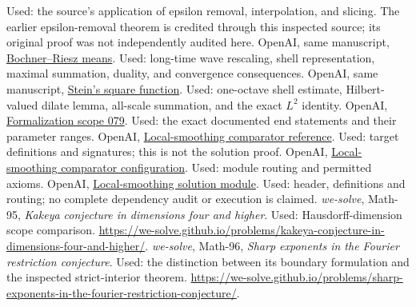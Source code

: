 \documentclass[11pt,a4paper]{article}
\numberwithin{equation}{section}
\theoremstyle{definition}
\theoremstyle{remark}
\newcommand{\repolink}[2]{\href{https://github.com/openai/math/blob/7ef5c0cc5ca4b0e072b7a050fca09ab24bc6fa3a/#1}{#2}}
\newcommand{\mathsource}[2]{\repolink{preprints/Local-smoothing-for-the-Euclidean-wave-equation-October-25-2026/build/sections/#1.tex}{#2}}
\begin{document}
\begin{thebibliography}{99}
Used: the source's application of epsilon removal, interpolation, and slicing.
The earlier epsilon-removal theorem is credited through this inspected source;
its original proof was not independently audited here.
 OpenAI, same manuscript,
\mathsource{consequences}{Bochner--Riesz means}.
Used: long-time wave rescaling, shell representation, maximal summation,
duality, and convergence consequences.
 OpenAI, same manuscript,
\mathsource{stein_square}{Stein's square function}.
Used: one-octave shell estimate, Hilbert-valued dilate lemma, all-scale summation,
and the exact $L^2$ identity.
 OpenAI,
\repolink{lean/docs/079.md}{Formalization scope 079}.
Used: the exact documented end statements and their parameter ranges.
 OpenAI,
\repolink{lean/ComparatorChallenges/LocalSmoothing.lean}{Local-smoothing comparator reference}.
Used: target definitions and signatures; this is not the solution proof.
 OpenAI,
\repolink{lean/ComparatorChallenges/LocalSmoothing.json}{Local-smoothing comparator configuration}.
Used: module routing and permitted axioms.
 OpenAI,
\repolink{lean/OAI/Analysis/Fourier/LocalSmoothing/Comparator.lean}{Local-smoothing solution module}.
Used: header, definitions and routing; no complete dependency audit or execution
is claimed.
 \emph{we-solve}, Math-95,
\emph{Kakeya conjecture in dimensions four and higher}.
Used: Hausdorff-dimension scope comparison.
\url{https://we-solve.github.io/problems/kakeya-conjecture-in-dimensions-four-and-higher/}.
 \emph{we-solve}, Math-96,
\emph{Sharp exponents in the Fourier restriction conjecture}.
Used: the distinction between its boundary formulation and the inspected
strict-interior theorem.
\url{https://we-solve.github.io/problems/sharp-exponents-in-the-fourier-restriction-conjecture/}.
\end{thebibliography}
\end{document}
